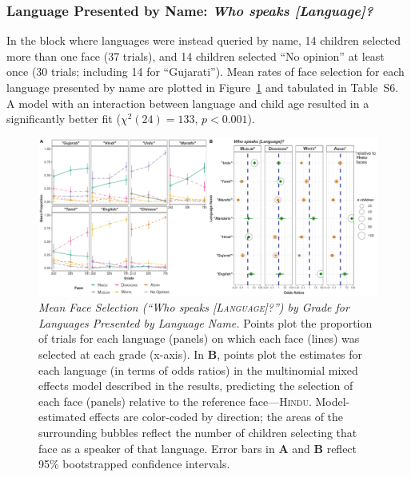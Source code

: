 \documentclass{foushee-adapted-preprint}
\newcommand{\facelabelmeanstab}{S6}
\begin{document}
\subsubsection{Language Presented by Name: \textit{Who speaks [Language]?}}
In the block where languages were instead queried by name, 14 children selected more than one face (37 trials), and 14 children selected ``No opinion'' at least once (30 trials; including 14 for ``Gujarati''). %
Mean rates of face selection for each language presented by name are plotted in Figure~\ref{fig:faces-language-name} and tabulated in Table~\facelabelmeanstab. 
A model with an interaction between language and child age resulted in a significantly better fit ($\chi^{2}(24)=133$, $p<0.001$). 
\begin{figure}
    \centering
    \includegraphics[width=\linewidth]{figures/combined_plots/combined_faces_label_finalized.pdf}
    \caption{\textit{Mean Face Selection (``Who speaks \emph{[\textsc{Language}]}?'') by Grade for Languages Presented by Language Name.}  
    Points plot the proportion of trials for each language (panels) on which each face (lines) was selected at each grade (x-axis). %
    In \textbf{B}, points plot the estimates for each language (in terms of odds ratios) in the multinomial mixed effects model described in the results, 
    predicting the selection of each face (panels) relative to the reference face---\textsc{Hindu}. %
    Model-estimated effects are color-coded by direction; the areas of the surrounding bubbles reflect the number of children selecting that face as a speaker of that language. 
    Error bars in \textbf{A} and \textbf{B} reflect 95\% bootstrapped confidence intervals.}
    \label{fig:faces-language-name}
\end{figure}
\end{document}
